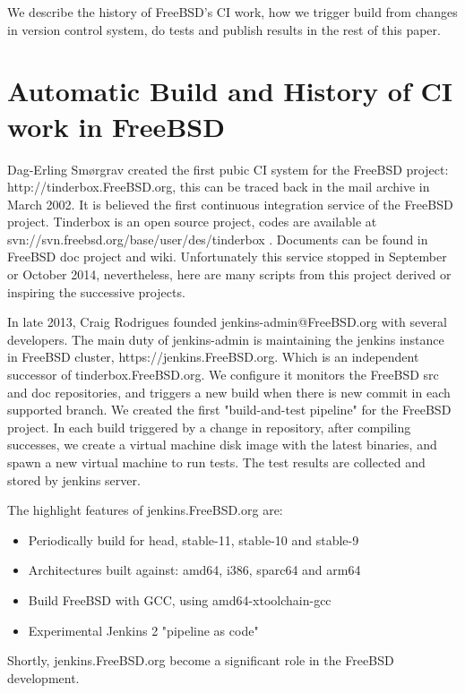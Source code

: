 \documentclass[a4paper,twocolumn,10pt]{article}
\begin{document}
We describe the history of FreeBSD's CI work, how we trigger build from changes
in version control system, do tests and publish results in the rest of this
paper.

\section{Automatic Build and History of CI work in FreeBSD}

Dag-Erling Smørgrav created the first pubic CI system for the FreeBSD project:
http://tinderbox.FreeBSD.org, this can be traced back in the mail archive in
March 2002. It is believed the first continuous integration service of the
FreeBSD project. Tinderbox is an open source project, codes are available at
svn://svn.freebsd.org/base/user/des/tinderbox .  Documents can be found in
FreeBSD doc project and wiki. Unfortunately this service stopped in September
or October 2014, nevertheless, here are many scripts from this project derived
or inspiring the successive projects.

In late 2013, Craig Rodrigues founded jenkins-admin@FreeBSD.org with several
developers. The main duty of jenkins-admin is maintaining the jenkins
instance in FreeBSD cluster, https://jenkins.FreeBSD.org. Which is an
independent successor of tinderbox.FreeBSD.org. We configure it monitors the
FreeBSD src and doc repositories, and triggers a new build when there is new
commit in each supported branch. We created the first "build-and-test pipeline"
for the FreeBSD project. In each build triggered by a change in repository,
after compiling successes, we create a virtual machine disk image with the
latest binaries, and spawn a new virtual machine to run tests. The test results
are collected and stored by jenkins server.

The highlight features of jenkins.FreeBSD.org are:

\begin{itemize}
\item Periodically build for head, stable-11, stable-10 and stable-9
\item Architectures built against: amd64, i386, sparc64 and arm64
\item Build FreeBSD with GCC, using amd64-xtoolchain-gcc
\item Experimental Jenkins 2 "pipeline as code"
\end{itemize}

Shortly, jenkins.FreeBSD.org become a significant role in the FreeBSD
development.
\end{document}
